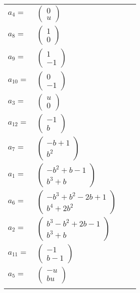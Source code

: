 \documentclass[1p]{elsarticle_modified}
\theoremstyle{definition}
\begin{document}
\begin{tabular}{m{7pt} m{180pt} m{7pt} m{180pt} }
\flushright $a_{4}=$&$\begin{pmatrix}0\\u\end{pmatrix}$ \\
\flushright $a_{8}=$&$\begin{pmatrix}1\\0\end{pmatrix}$ \\
\flushright $a_{9}=$&$\begin{pmatrix}1\\-1\end{pmatrix}$ \\
\flushright $a_{10}=$&$\begin{pmatrix}0\\-1\end{pmatrix}$ \\
\flushright $a_{3}=$&$\begin{pmatrix}u\\0\end{pmatrix}$ \\
\flushright $a_{12}=$&$\begin{pmatrix}-1\\b\end{pmatrix}$ \\
\flushright $a_{7}=$&$\begin{pmatrix}- b+1\\b^2\end{pmatrix}$ \\
\flushright $a_{1}=$&$\begin{pmatrix}- b^2+b-1\\b^3+b\end{pmatrix}$ \\
\flushright $a_{6}=$&$\begin{pmatrix}- b^3+b^2-2 b+1\\b^4+2 b^2\end{pmatrix}$ \\
\flushright $a_{2}=$&$\begin{pmatrix}b^3- b^2+2 b-1\\b^3+b\end{pmatrix}$ \\
\flushright $a_{11}=$&$\begin{pmatrix}-1\\b-1\end{pmatrix}$ \\
\flushright $a_{5}=$&$\begin{pmatrix}- u\\b u\end{pmatrix}$\\&\end{tabular}
\end{document}
